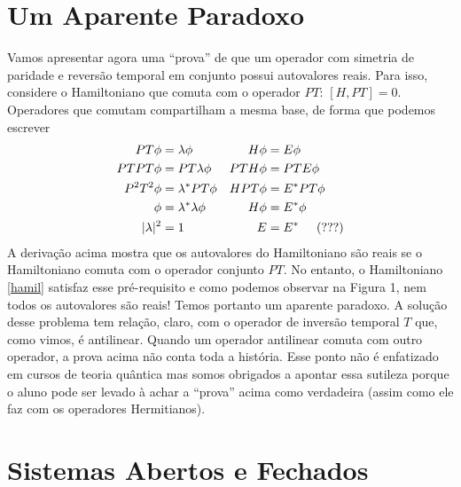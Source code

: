 \documentclass{article}
\begin{document}
\section{Um Aparente Paradoxo}

Vamos apresentar agora uma ``prova'' de que um operador com simetria de paridade e reversão temporal em conjunto possui autovalores reais. Para isso, considere o Hamiltoniano que comuta com o operador $PT$: $[H,PT] = 0$. Operadores que comutam compartilham a mesma base, de forma que podemos escrever
\begin{align*}
 PT\phi             &= \lambda\phi                &   H\phi  &= E \phi \\
 PTPT\phi   &= PT\lambda\phi      &   PTH\phi  &= PTE \phi \\
 P^2 T^2 \phi       &= \lambda^* PT\phi   &   HPT\phi  &= E^* PT \phi \\
 \phi                       &= \lambda^* \lambda \phi     &   H\phi  &= E^* \phi \\ 
 |\lambda|^2 &= 1                                          &   E  &= E^* \hspace{0.5cm} \text{(???)}
\end{align*}
A derivação acima mostra que os autovalores do Hamiltoniano são reais se o Hamiltoniano comuta com o operador conjunto $PT$. No entanto, o Hamiltoniano \eqref{hamil} satisfaz esse pré-requisito e como podemos observar na Figura 1, nem todos os autovalores são reais! Temos portanto um aparente paradoxo. A solução desse problema tem relação, claro, com o operador de inversão temporal $T$ que, como vimos, é antilinear. Quando um operador antilinear comuta com outro operador, a prova acima não conta toda a história. Esse ponto não é enfatizado em cursos de teoria quântica mas somos obrigados a apontar essa sutileza porque o aluno pode ser levado à achar a ``prova'' acima como verdadeira (assim como ele faz com os operadores Hermitianos). 


\section{Sistemas Abertos e Fechados}
\end{document}
